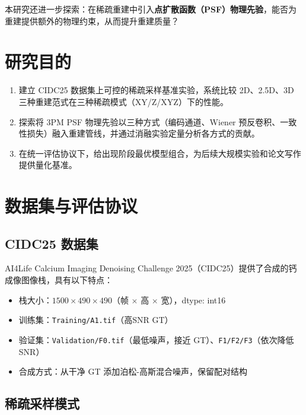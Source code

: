\documentclass[UTF8, scheme=plain, 11pt, a4paper]{ctexart}
\begin{document}
本研究还进一步探索：在稀疏重建中引入\textbf{点扩散函数（PSF）物理先验}，能否为重建提供额外的物理约束，从而提升重建质量？

\section{研究目的}

\begin{enumerate}[leftmargin=*, label=\textbf{目的\arabic*.}]
  \item 建立 CIDC25 数据集上可控的稀疏采样基准实验，系统比较 2D、2.5D、3D 三种重建范式在三种稀疏模式（XY/Z/XYZ）下的性能。
  \item 探索将 3PM PSF 物理先验以三种方式（编码通道、Wiener 预反卷积、一致性损失）融入重建管线，并通过消融实验定量分析各方式的贡献。
  \item 在统一评估协议下，给出现阶段最优模型组合，为后续大规模实验和论文写作提供量化基准。
\end{enumerate}

\section{数据集与评估协议}

\subsection{CIDC25 数据集}

AI4Life Calcium Imaging Denoising Challenge 2025（CIDC25）提供了合成的钙成像图像栈，具有以下特点：

\begin{itemize}
  \item 栈大小：$1500 \times 490 \times 490$（帧 $\times$ 高 $\times$ 宽），dtype: int16
  \item 训练集：\texttt{Training/A1.tif}（高SNR GT）
  \item 验证集：\texttt{Validation/F0.tif}（最低噪声，接近 GT）、\texttt{F1/F2/F3}（依次降低 SNR）
  \item 合成方式：从干净 GT 添加泊松-高斯混合噪声，保留配对结构
\end{itemize}

\subsection{稀疏采样模式}
\end{document}
